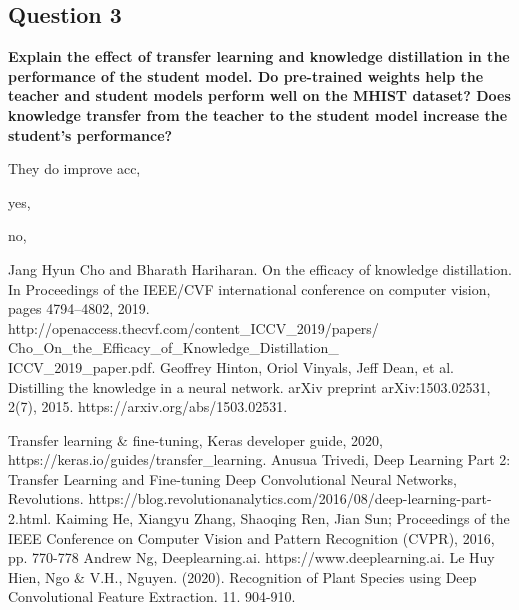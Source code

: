 \documentclass[conference]{IEEEtran}
\begin{document}
\subsection{Question 3} \textbf{Explain the effect of transfer learning and knowledge distillation in the performance of the student model. Do pre-trained weights help the teacher and student models perform well on the MHIST dataset? Does knowledge transfer from the teacher to the student model increase the student’s performance?}

They do improve acc,

yes,

no,

\begin{thebibliography}{00}


 Jang Hyun Cho and Bharath Hariharan. On the efficacy of knowledge distillation. In Proceedings of the IEEE/CVF international conference on computer vision, pages 4794–4802, 2019. http://openaccess.thecvf.com/content\_ICCV\_2019/papers/\\Cho\_On\_the\_Efficacy\_of\_Knowledge\_Distillation\_\\ICCV\_2019\_paper.pdf.
 Geoffrey Hinton, Oriol Vinyals, Jeff Dean, et al. Distilling the knowledge in a neural network. arXiv preprint arXiv:1503.02531, 2(7), 2015. https://arxiv.org/abs/1503.02531.


 Transfer learning \& fine-tuning, Keras developer guide, 2020, https://keras.io/guides/transfer\_learning.
 Anusua Trivedi, Deep Learning Part 2: Transfer Learning and Fine-tuning Deep Convolutional Neural Networks, Revolutions. https://blog.revolutionanalytics.com/2016/08/deep-learning-part-2.html.
 Kaiming He, Xiangyu Zhang, Shaoqing Ren, Jian Sun; Proceedings of the IEEE Conference on Computer Vision and Pattern Recognition (CVPR), 2016, pp. 770-778
 Andrew Ng, Deeplearning.ai. https://www.deeplearning.ai.
Le Huy Hien, Ngo \& V.H., Nguyen. (2020). Recognition of Plant Species using Deep Convolutional Feature Extraction. 11. 904-910.
\end{thebibliography}
\end{document}
